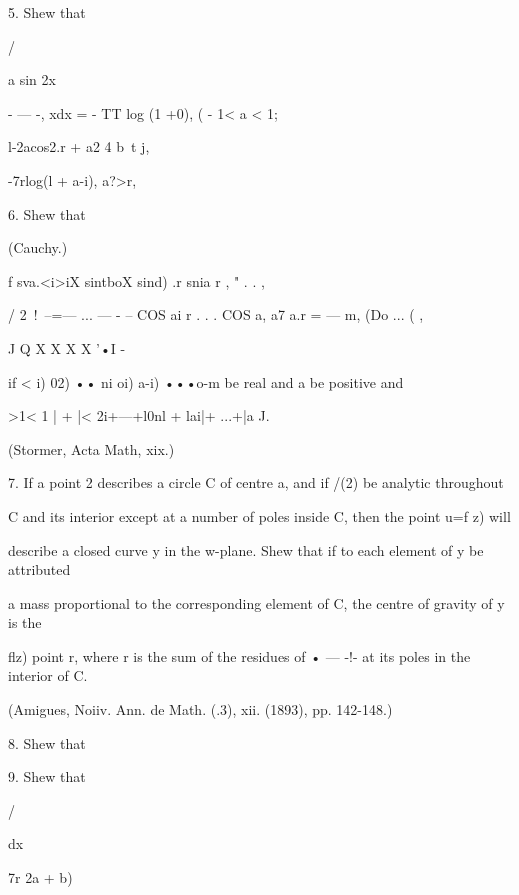 5. Shew that 



/ 



a sin 2x 



- — -, xdx = - TT log (1 +0), ( - 1< a < 1; 

l-2acos2.r + a2 4 b\ t j, \ 



-7rlog(l + a-i),  a?>r, 



6. Shew that 



(Cauchy.) 



f sva.<i>iX sintboX sind) .r snia r , "  . . , 

/ 2\ !\   --=— ... — - --  COS ai r . . . COS a, a7 a.r = — m, (Do ... (  , 

J Q X X X X '•I  -   

if < i) 02)  •• ni oi) a-i) •••o-m be real and a be positive and 

 >1< 1 | + |< 2i+---+l0nl + lai|+ ...+|a J. 

(Stormer, Acta Math, xix.) 

7. If a point 2 describes a circle C of centre a, and if /(2) be analytic throughout 

C and its interior except at a number of poles inside C, then the point u=f z) will 

describe a closed curve y in the w-plane. Shew that if to each element of y be attributed 

a mass proportional to the corresponding element of C, the centre of gravity of y is the 

flz) 
point r, where r is the sum of the residues of • — -!- at its poles in the interior of C. 



(Amigues, Noiiv. Ann. de Math. (.3), xii. (1893), pp. 142-148.) 



8. Shew that 



9. Shew that 



/ 



dx 



7r 2a + b) 



